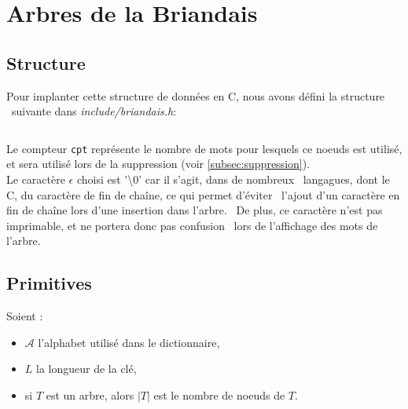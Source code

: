 \documentclass[11pt]{report} %
\begin{document}
\chapter{Arbres de la Briandais}

\section{Structure}

Pour implanter cette structure de données en C, nous avons défini la structure \
suivante dans \textit{include/briandais.h}:
\inputminted[firstline=16, lastline=21]{c}{../include/briandais.h}
Le compteur \texttt{cpt} représente le nombre de mots pour lesquels ce noeuds est utilisé, et sera utilisé lors de la suppression (voir \ref{subsec:suppression}).\\
Le caractère $\epsilon$ choisi est '\textbackslash 0' car il s'agit, dans de nombreux \
langagues, dont le C, du caractère de fin de chaîne, ce qui permet d'éviter \
l'ajout d'un caractère en fin de chaîne lors d'une insertion dans l'arbre. \
De plus, ce caractère n'est pas imprimable, et ne portera donc pas confusion \
lors de l'affichage des mots de l'arbre.

\section{Primitives}
Soient :
\begin{itemize}
\item $\mathcal{A}$ l'alphabet utilisé dans le dictionnaire,
\item $L$ la longueur de la clé,
\item si $T$ est un arbre, alors $|T|$ est le nombre de noeuds de $T$.
\end{itemize}
\end{document}
